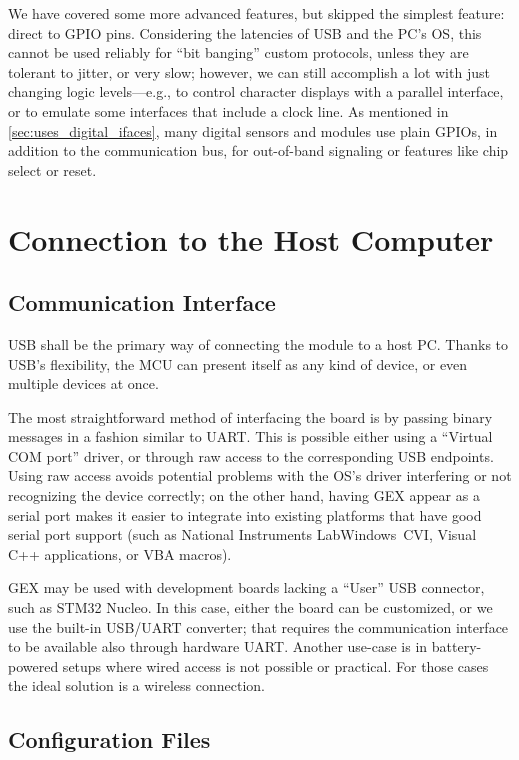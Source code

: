 We have covered some more advanced features, but skipped the simplest feature: direct  to \gls{GPIO} pins. Considering the latencies of \gls{USB} and the \gls{PC}'s \gls{OS}, this cannot be used reliably for ``bit banging'' custom protocols, unless they are tolerant to jitter, or very slow; however, we can still accomplish a lot with just changing logic levels---e.g., to control character displays with a parallel interface, or to emulate some interfaces that include a clock line. As mentioned in \cref{sec:uses_digital_ifaces}, many digital sensors and modules use plain \glspl{GPIO}, in addition to the communication bus, for out-of-band signaling or features like chip select or reset.

\section{Connection to the Host Computer}

\subsection{Communication Interface}

\gls{USB} shall be the primary way of connecting the module to a host \gls{PC}. Thanks to \gls{USB}'s flexibility, the \gls{MCU} can present itself as any kind of device, or even multiple devices at once.

The most straightforward method of interfacing the board is by passing binary messages in a fashion similar to \gls{UART}. This is possible either using a ``Virtual COM port'' driver, or through raw access to the corresponding \gls{USB} endpoints. Using raw access avoids potential problems with the \gls{OS}'s driver interfering or not recognizing the device correctly; on the other hand, having GEX appear as a serial port makes it easier to integrate into existing platforms that have good serial port support (such as National Instruments LabWindows~CVI, Visual C++ applications, or VBA macros).

GEX may be used with development boards lacking a ``User'' \gls{USB} connector, such as STM32 Nucleo. In this case, either the board can be customized, or we use the built-in \gls{USB}/\gls{UART} converter; that requires the communication interface to be available also through hardware \gls{UART}. Another use-case is in battery-powered setups where wired access is not possible or practical. For those cases the ideal solution is a wireless connection.

\subsection{Configuration Files}


